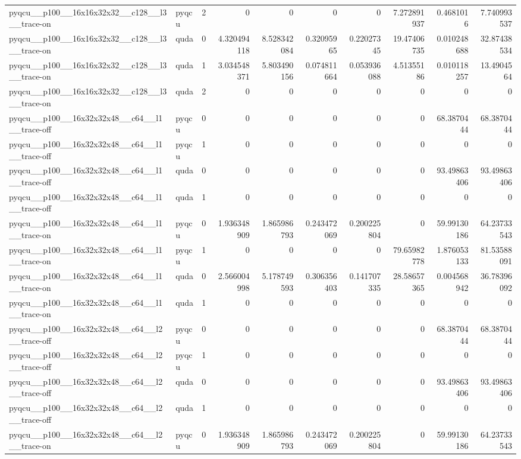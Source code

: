 \begin{table}[htbp]
\begin{tabular}{@{}llrrrrrrrr@{}}
pyqcu\_\_p100\_\_16x16x32x32\_\_c128\_\_l3\_\_trace-on & pyqcu & 2 & 0 & 0 & 0 & 0 & 7.272891937 & 0.4681016 & 7.740993537 \\
pyqcu\_\_p100\_\_16x16x32x32\_\_c128\_\_l3\_\_trace-on & quda & 0 & 4.320494118 & 8.528342084 & 0.32095965 & 0.22027345 & 19.47406735 & 0.010248688 & 32.87438534 \\
pyqcu\_\_p100\_\_16x16x32x32\_\_c128\_\_l3\_\_trace-on & quda & 1 & 3.034548371 & 5.803490156 & 0.074811664 & 0.053936088 & 4.51355186 & 0.010118257 & 13.4904564 \\
pyqcu\_\_p100\_\_16x16x32x32\_\_c128\_\_l3\_\_trace-on & quda & 2 & 0 & 0 & 0 & 0 & 0 & 0 & 0 \\
pyqcu\_\_p100\_\_16x32x32x48\_\_c64\_\_l1\_\_trace-off & pyqcu & 0 & 0 & 0 & 0 & 0 & 0 & 68.3870444 & 68.3870444 \\
pyqcu\_\_p100\_\_16x32x32x48\_\_c64\_\_l1\_\_trace-off & pyqcu & 1 & 0 & 0 & 0 & 0 & 0 & 0 & 0 \\
pyqcu\_\_p100\_\_16x32x32x48\_\_c64\_\_l1\_\_trace-off & quda & 0 & 0 & 0 & 0 & 0 & 0 & 93.49863406 & 93.49863406 \\
pyqcu\_\_p100\_\_16x32x32x48\_\_c64\_\_l1\_\_trace-off & quda & 1 & 0 & 0 & 0 & 0 & 0 & 0 & 0 \\
pyqcu\_\_p100\_\_16x32x32x48\_\_c64\_\_l1\_\_trace-on & pyqcu & 0 & 1.936348909 & 1.865986793 & 0.243472069 & 0.200225804 & 0 & 59.99130186 & 64.23733543 \\
pyqcu\_\_p100\_\_16x32x32x48\_\_c64\_\_l1\_\_trace-on & pyqcu & 1 & 0 & 0 & 0 & 0 & 79.65982778 & 1.876053133 & 81.53588091 \\
pyqcu\_\_p100\_\_16x32x32x48\_\_c64\_\_l1\_\_trace-on & quda & 0 & 2.566004998 & 5.178749593 & 0.306356403 & 0.141707335 & 28.58657365 & 0.004568942 & 36.78396092 \\
pyqcu\_\_p100\_\_16x32x32x48\_\_c64\_\_l1\_\_trace-on & quda & 1 & 0 & 0 & 0 & 0 & 0 & 0 & 0 \\
pyqcu\_\_p100\_\_16x32x32x48\_\_c64\_\_l2\_\_trace-off & pyqcu & 0 & 0 & 0 & 0 & 0 & 0 & 68.3870444 & 68.3870444 \\
pyqcu\_\_p100\_\_16x32x32x48\_\_c64\_\_l2\_\_trace-off & pyqcu & 1 & 0 & 0 & 0 & 0 & 0 & 0 & 0 \\
pyqcu\_\_p100\_\_16x32x32x48\_\_c64\_\_l2\_\_trace-off & quda & 0 & 0 & 0 & 0 & 0 & 0 & 93.49863406 & 93.49863406 \\
pyqcu\_\_p100\_\_16x32x32x48\_\_c64\_\_l2\_\_trace-off & quda & 1 & 0 & 0 & 0 & 0 & 0 & 0 & 0 \\
pyqcu\_\_p100\_\_16x32x32x48\_\_c64\_\_l2\_\_trace-on & pyqcu & 0 & 1.936348909 & 1.865986793 & 0.243472069 & 0.200225804 & 0 & 59.99130186 & 64.23733543 \\

\end{tabular}
\end{table}
